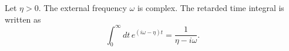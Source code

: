 \documentclass{article}
\begin{document}
Let $\eta>0$.  The external frequency \(\omega\) is complex.
The retarded time integral is written as
\begin{equation}
\int_0^{\infty} dt\, e^{(i\omega-\eta)t}=\frac{1}{\eta-i\omega}.\label{complex-frequency}
\end{equation}
\end{document}
